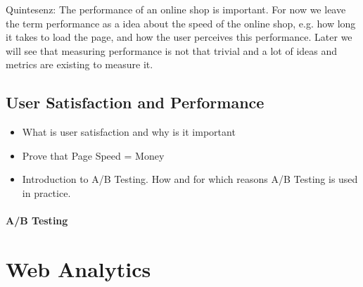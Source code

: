 


Quintesenz: The performance of an online shop is important.
For now we leave the term performance as a idea about the speed of the online shop, e.g. how long it takes to load the page, and how the user perceives this performance.
Later we will see that measuring performance is not that trivial and a lot of ideas and metrics are existing to measure it.






\subsection{User Satisfaction and Performance}

\begin{itemize}
\item What is user satisfaction and why is it important
\item Prove that Page Speed = Money
\item Introduction to A/B Testing. How and for which reasons A/B Testing is used in practice.
\end{itemize}





\paragraph{A/B Testing}










\section{Web Analytics}


